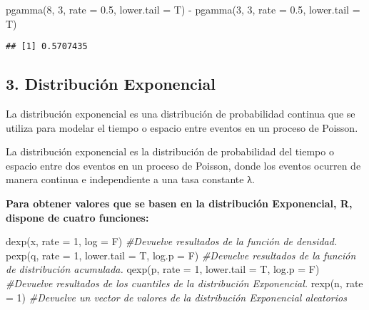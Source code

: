 \documentclass[
]{article}
\newenvironment{Shaded}{\begin{snugshade}}{\end{snugshade}}
\newcommand{\AttributeTok}[1]{\textcolor[rgb]{0.77,0.63,0.00}{#1}}
\newcommand{\CommentTok}[1]{\textcolor[rgb]{0.56,0.35,0.01}{\textit{#1}}}
\newcommand{\DecValTok}[1]{\textcolor[rgb]{0.00,0.00,0.81}{#1}}
\newcommand{\FloatTok}[1]{\textcolor[rgb]{0.00,0.00,0.81}{#1}}
\newcommand{\FunctionTok}[1]{\textcolor[rgb]{0.00,0.00,0.00}{#1}}
\newcommand{\NormalTok}[1]{#1}
\newcommand{\SpecialCharTok}[1]{\textcolor[rgb]{0.00,0.00,0.00}{#1}}
\begin{document}
\begin{Shaded}
\begin{Highlighting}[]
\FunctionTok{pgamma}\NormalTok{(}\DecValTok{8}\NormalTok{, }\DecValTok{3}\NormalTok{, }\AttributeTok{rate =} \FloatTok{0.5}\NormalTok{, }\AttributeTok{lower.tail =}\NormalTok{ T) }\SpecialCharTok{{-}} \FunctionTok{pgamma}\NormalTok{(}\DecValTok{3}\NormalTok{, }\DecValTok{3}\NormalTok{, }\AttributeTok{rate =} \FloatTok{0.5}\NormalTok{, }\AttributeTok{lower.tail =}\NormalTok{ T)}
\end{Highlighting}
\end{Shaded}

\begin{verbatim}
## [1] 0.5707435
\end{verbatim}

\hypertarget{distribuciuxf3n-exponencial}{%
\subsection{3. Distribución
Exponencial}\label{distribuciuxf3n-exponencial}}

La distribución exponencial es una distribución de probabilidad continua
que se utiliza para modelar el tiempo o espacio entre eventos en un
proceso de Poisson.

La distribución exponencial es la distribución de probabilidad del
tiempo o espacio entre dos eventos en un proceso de Poisson, donde los
eventos ocurren de manera continua e independiente a una tasa constante
λ.

\textbf{Para obtener valores que se basen en la distribución
Exponencial, R, dispone de cuatro funciones:}

\begin{Shaded}
\begin{Highlighting}[]
\FunctionTok{dexp}\NormalTok{(x, }\AttributeTok{rate =} \DecValTok{1}\NormalTok{, }\AttributeTok{log =}\NormalTok{ F)  }\CommentTok{\#Devuelve resultados de la función de densidad.}
\FunctionTok{pexp}\NormalTok{(q, }\AttributeTok{rate =} \DecValTok{1}\NormalTok{, }\AttributeTok{lower.tail =}\NormalTok{ T, }\AttributeTok{log.p =}\NormalTok{ F)    }\CommentTok{\#Devuelve resultados de la función de distribución acumulada.}
\FunctionTok{qexp}\NormalTok{(p, }\AttributeTok{rate =} \DecValTok{1}\NormalTok{, }\AttributeTok{lower.tail =}\NormalTok{ T, }\AttributeTok{log.p =}\NormalTok{ F)    }\CommentTok{\#Devuelve resultados de los cuantiles de la distribución Exponencial.}
\FunctionTok{rexp}\NormalTok{(n, }\AttributeTok{rate =} \DecValTok{1}\NormalTok{)   }\CommentTok{\#Devuelve un vector de valores de la distribución Exponencial aleatorios}
\end{Highlighting}
\end{Shaded}
\end{document}
